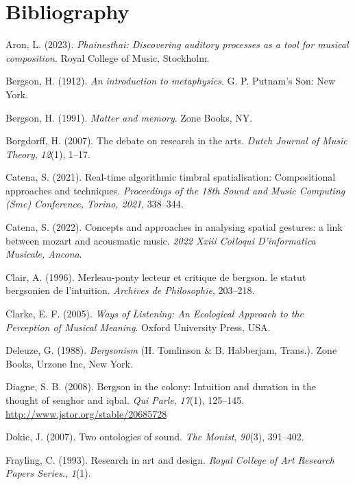 \documentclass[11pt]{article}
\begin{document}
\section*{Bibliography}
\label{sec:org6909a92}
\begin{hangparas}{1.5em}{1}
\hypertarget{citeproc_bib_item_1}{Aron, L. (2023). \textit{Phainesthai: Discovering auditory processes as a tool for musical composition}. Royal College of Music, Stockholm.}

\hypertarget{citeproc_bib_item_2}{Bergson, H. (1912). \textit{An introduction to metaphysics}. G. P. Putnam’s Son: New York.}

\hypertarget{citeproc_bib_item_3}{Bergson, H. (1991). \textit{Matter and memory}. Zone Books, NY.}

\hypertarget{citeproc_bib_item_4}{Borgdorff, H. (2007). The debate on research in the arts. \textit{Dutch Journal of Music Theory}, \textit{12}(1), 1–17.}

\hypertarget{citeproc_bib_item_5}{Catena, S. (2021). Real-time algorithmic timbral spatialisation: Compositional approaches and techniques. \textit{Proceedings of the 18th Sound and Music Computing (Smc) Conference, Torino, 2021}, 338–344.}

\hypertarget{citeproc_bib_item_6}{Catena, S. (2022). Concepts and approaches in analysing spatial gestures: a link between mozart and acousmatic music. \textit{2022 Xxiii Colloqui D’informatica Musicale, Ancona}.}

\hypertarget{citeproc_bib_item_7}{Clair, A. (1996). Merleau-ponty lecteur et critique de bergson. le statut bergsonien de l’intuition. \textit{Archives de Philosophie}, 203–218.}

\hypertarget{citeproc_bib_item_8}{Clarke, E. F. (2005). \textit{Ways of Listening: An Ecological Approach to the Perception of Musical Meaning}. Oxford University Press, USA.}

\hypertarget{citeproc_bib_item_9}{Deleuze, G. (1988). \textit{Bergsonism} (H. Tomlinson \& B. Habberjam, Trans.). Zone Books, Urzone Inc, New York.}

\hypertarget{citeproc_bib_item_10}{Diagne, S. B. (2008). Bergson in the colony: Intuition and duration in the thought of senghor and iqbal. \textit{Qui Parle}, \textit{17}(1), 125–145. \url{http://www.jstor.org/stable/20685728}}

\hypertarget{citeproc_bib_item_11}{Dokic, J. (2007). Two ontologies of sound. \textit{The Monist}, \textit{90}(3), 391–402.}

\hypertarget{citeproc_bib_item_12}{Frayling, C. (1993). Research in art and design. \textit{Royal College of Art Research Papers Series.}, \textit{1}(1).}


\end{hangparas}
\end{document}
